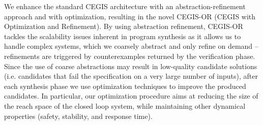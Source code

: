 \documentclass[sigconf]{llncs}
\begin{document}
%
We enhance the standard CEGIS architecture with an
abstraction-refinement approach and with optimization, resulting in
the novel CEGIS-OR (CEGIS with Optimization and Refinement).  By using
abstraction refinement, CEGIS-OR tackles the scalability issues
inherent in program synthesis as it allows us to handle complex
systems, which we coarsely abstract and only refine on demand --
refinements are triggered by counterexamples returned by the
verification phase.
Since the use of coarse abstractions may result in
low-quality candidate solutions (i.e. candidates that fail the
specification on a very large number of inputs), after each synthesis
phase we use optimization techniques to improve the produced
candidates.  In particular, our optimization procedure aims at
reducing the size of the reach space of the closed loop system, while
maintaining other dynamical properties (safety, stability, and
response time).

\end{document}
